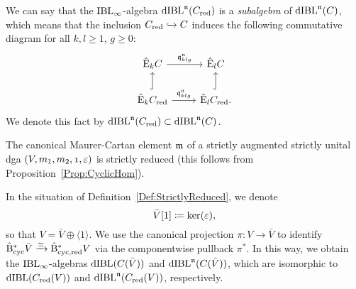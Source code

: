 \documentclass[\MainFolder/Text.tex]{subfiles}
\begin{document}
\begin{Remark}
\begin{RemarkList}
\item We can say that the $\mathrm{IBL}_\infty$-algebra $\mathrm{dIBL}^{\mathfrak{n}}(C_{\mathrm{red}})$ is a \emph{subalgebra} of $\mathrm{dIBL}^{\mathfrak{n}}(C)$, which means that the inclusion $C_{\mathrm{red}}\xhookrightarrow{}C$ induces the following commutative diagram for all $k,l\ge 1$, $g\ge 0$:
$$\begin{tikzcd}
\hat{\Ext}_k \CycC \arrow{r}{\OPQ_{klg}^\PMC} & \hat{\Ext}_l \CycC \\
\hat{\Ext}_k \CycC_{\mathrm{red}} \arrow{r}{\OPQ_{klg}^\PMC}\arrow[hook]{u} & \hat{\Ext}_l \CycC_{\mathrm{red}}.\arrow[hook]{u}
\end{tikzcd}$$
We denote this fact by $\mathrm{dIBL}^{\mathfrak{n}}(C_{\mathrm{red}})\subset \mathrm{dIBL}^{\mathfrak{n}}(C)$.

\item The canonical Maurer-Cartan element $\mathfrak{m}$ of a strictly augmented strictly unital dga $(V,m_1,m_2,\NOne,\varepsilon)$ is strictly reduced (this follows from Proposition~\ref{Prop:CyclicHom}).

\item In the situation of Definition~\ref{Def:StrictlyReduced}, we denote 
$$ \bar{V}[1]\coloneqq \operatorname{ker}(\varepsilon),$$
so that $V=\bar{V}\oplus \langle 1 \rangle$. We use  the canonical projection $\pi: V \rightarrow \bar{V}$ to identify $\hat{\mathrm{B}}_{\mathrm{cyc}}^* \bar{V} \xrightarrow{\simeq} \hat{\mathrm{B}}^*_{\mathrm{cyc},\mathrm{red}} V$ via the componentwise pullback $\pi^*$. In this way, we obtain the $\mathrm{IBL}_\infty$-algebras $\mathrm{dIBL}(C(\bar{V}))$ and $\mathrm{dIBL}^{\mathfrak{n}}(C(\bar{V}))$, which are isomorphic to $\mathrm{dIBL}(C_{\mathrm{red}}(V))$ and $\mathrm{dIBL}^{\mathfrak{n}}(C_{\mathrm{red}}(V))$, respectively.
\qedhere
\end{RemarkList}
\end{Remark}
\end{document}
